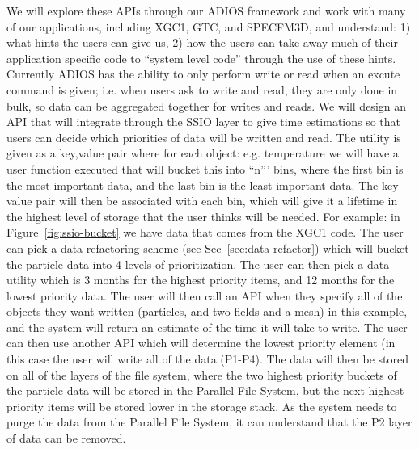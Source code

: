 %
We will explore these APIs through our ADIOS framework and work with many of our applications, 
including XGC1, GTC, and SPECFM3D, and understand: 1) what hints the users can give us, 2) how
the users can take away much of their application specific code to ``system level code'' through the use of these hints.
Currently ADIOS has the ability to only perform write or read when an excute command is given; i.e. when users 
ask to write and read, they are only done in  bulk, so data can be aggregated together for writes and reads. We will
design an API that will integrate through the SSIO layer to give time estimations so that users can decide 
which priorities of data will be written and read. The utility is given as a key,value pair where for each object: e.g. temperature
we will have a user function executed that will bucket this into ``n''' bins, where the first bin is the most important data, and the
last bin is the least important data. The key value pair will then be associated with each bin, which will give it a lifetime in the highest level
of storage that the user thinks will be needed. For example: in Figure~\ref{fig:ssio-bucket} we have data that comes from the XGC1 code.
The user can pick a data-refactoring scheme (see Sec~\ref{sec:data-refactor}) which will bucket the particle data into 4 levels of prioritization.
The user can then pick a data utility which is 3 months for the highest priority items, and 12 months for the lowest priority data. 
The user will then call an API when they specify all of the objects they want written (particles, and two fields and a mesh) in this example, and
the system will return an estimate of the time it will take to write. The user can then use another API which will determine the lowest priority
element (in this case the user will write all of the data (P1-P4). The data will then be stored on all of the layers of the file system, where the
two highest priority buckets of the particle data will be stored in the Parallel File System, but the next  highest priority items will be stored
lower in the storage stack. As the system needs to purge the data from the Parallel File System, it can understand that the P2 layer of
data can be removed. 
%


